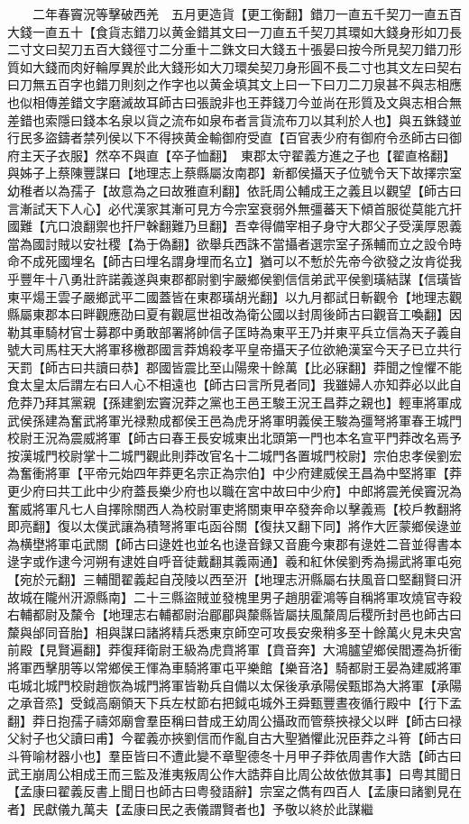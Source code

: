 　　二年春竇況等擊破西羌　五月更造貨【更工衡翻】錯刀一直五千契刀一直五百大錢一直五十【食貨志錯刀以黄金錯其文曰一刀直五千契刀其環如大錢身形如刀長二寸文曰契刀五百大錢徑寸二分重十二銖文曰大錢五十張晏曰按今所見契刀錯刀形質如大錢而肉好輪厚異於此大錢形如大刀環矣契刀身形圓不長二寸也其文左曰契右曰刀無五百字也錯刀則刻之作字也以黄金填其文上曰一下曰刀二刀泉甚不與志相應也似相傳差錯文字磨滅故耳師古曰張說非也王莽錢刀今並尚在形質及文與志相合無差錯也索隱曰錢本名泉以貨之流布如泉布者言貨流布刀以其利於人也】與五銖錢並行民多盜鑄者禁列侯以下不得挾黄金輸御府受直【百官表少府有御府令丞師古曰御府主天子衣服】然卒不與直【卒子恤翻】　東郡太守翟義方進之子也【翟直格翻】與姊子上蔡陳豐謀曰【地理志上蔡縣屬汝南郡】新都侯攝天子位號令天下故擇宗室幼稚者以為孺子【故意為之曰故雅直利翻】依託周公輔成王之義且以觀望【師古曰言漸試天下人心】必代漢家其漸可見方今宗室衰弱外無彊蕃天下傾首服從莫能亢扞國難【亢口浪翻禦也扞尸榦翻難乃旦翻】吾幸得備宰相子身守大郡父子受漢厚恩義當為國討賊以安社稷【為于偽翻】欲舉兵西誅不當攝者選宗室子孫輔而立之設令時命不成死國埋名【師古曰埋名謂身埋而名立】猶可以不慙於先帝今欲發之汝肯從我乎豐年十八勇壯許諾義遂與東郡都尉劉宇嚴鄉侯劉信信弟武平侯劉璜結謀【信璜皆東平煬王雲子嚴鄉武平二國蓋皆在東郡璜胡光翻】以九月都試日斬觀令【地理志觀縣屬東郡本曰畔觀應劭曰夏有觀扈世祖改為衛公國以封周後師古曰觀音工喚翻】因勒其車騎材官士募郡中勇敢部署將帥信子匡時為東平王乃并東平兵立信為天子義自號大司馬柱天大將軍移檄郡國言莽鴆殺孝平皇帝攝天子位欲絶漢室今天子已立共行天罰【師古曰共讀曰恭】郡國皆震比至山陽衆十餘萬【比必寐翻】莽聞之惶懼不能食太皇太后謂左右曰人心不相遠也【師古曰言所見者同】我雖婦人亦知莽必以此自危莽乃拜其黨親【孫建劉宏竇況莽之黨也王邑王駿王況王昌莽之親也】輕車將軍成武侯孫建為奮武將軍光禄勲成都侯王邑為虎牙將軍明義侯王駿為彊弩將軍春王城門校尉王況為震威將軍【師古曰春王長安城東出北頭第一門也本名宣平門莽改名焉予按漢城門校尉掌十二城門觀此則莽改官名十二城門各置城門校尉】宗伯忠孝侯劉宏為奮衝將軍【平帝元始四年莽更名宗正為宗伯】中少府建威侯王昌為中堅將軍【莽更少府曰共工此中少府蓋長樂少府也以職在宮中故曰中少府】中郎將震羌侯竇況為奮威將軍凡七人自擇除關西人為校尉軍吏將關東甲卒發奔命以擊義焉【校戶教翻將即亮翻】復以太僕武讓為積弩將軍屯函谷關【復扶又翻下同】將作大匠蒙鄉侯逯並為横壄將軍屯武關【師古曰逯姓也並名也逯音録又音鹿今東郡有逯姓二音並得書本逯字或作逮今河朔有逮姓自呼音徒戴翻其義兩通】羲和紅休侯劉秀為揚武將軍屯宛【宛於元翻】三輔聞翟義起自茂陵以西至汧【地理志汧縣屬右扶風音口堅翻賢曰汧故城在隴州汧源縣南】二十三縣盜賊並發槐里男子趙朋霍鴻等自稱將軍攻燒官寺殺右輔都尉及斄令【地理志右輔都尉治郿郿與斄縣皆屬扶風斄周后稷所封邑也師古曰斄與邰同音胎】相與謀曰諸將精兵悉東京師空可攻長安衆稍多至十餘萬火見未央宮前殿【見賢遍翻】莽復拜衛尉王級為虎賁將軍【賁音奔】大鴻臚望鄉侯閻遷為折衝將軍西擊朋等以常鄉侯王惲為車騎將軍屯平樂館【樂音洛】騎都尉王晏為建威將軍屯城北城門校尉趙恢為城門將軍皆勒兵自備以太保後承承陽侯甄邯為大將軍【承陽之承音烝】受鉞高廟領天下兵左杖節右把鉞屯城外王舜甄豐晝夜循行殿中【行下孟翻】莽日抱孺子禱郊廟會羣臣稱曰昔成王幼周公攝政而管蔡挾禄父以畔【師古曰禄父紂子也父讀曰甫】今翟義亦挾劉信而作亂自古大聖猶懼此況臣莽之斗筲【師古曰斗筲喻材器小也】羣臣皆曰不遭此變不章聖德冬十月甲子莽依周書作大誥【師古曰武王崩周公相成王而三監及淮夷叛周公作大誥莽自比周公故依倣其事】曰粤其聞日【孟康曰翟義反書上聞日也師古曰粤發語辭】宗室之儁有四百人【孟康曰諸劉見在者】民獻儀九萬夫【孟康曰民之表儀謂賢者也】予敬以終於此謀繼